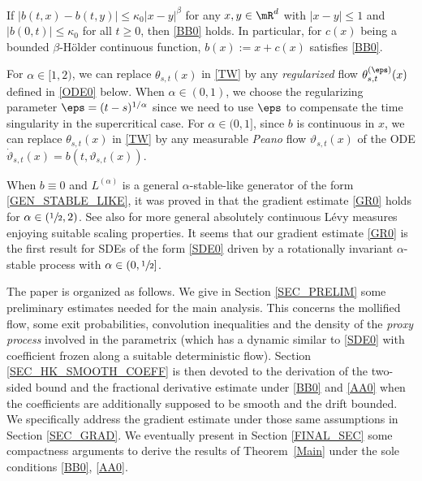 \begin{remark}
If $|b(t,x)-b(t,y)|\leq\kappa_0|x-y|^\beta$ for any $x,y\in\mR^d$ with $|x-y|\leq 1$ and $|b(0,t)|\le \kappa_0 $ for all $t\ge 0 $, then
\eqref{BB0} holds. In particular, for $c(x)$ being a bounded $\beta$-Hölder continuous function, $b(x):=x+c(x)$ satisfies \eqref{BB0}.
\end{remark}

\begin{remark}
For $\alpha\in[1,2)$, we can replace $\theta_{s,t}(x)$ in \eqref{TW} by any {\it regularized} flow $\theta^{(\eps)}_{s,t}(x)$
defined in \eqref{ODE0} below. When $\alpha\in(0,1)$, we choose the regularizing parameter $\eps=(t-s)^{1/\alpha}$ since we need to use $\eps$ to compensate the
time singularity in the supercritical case.
For $\alpha\in(0,1]$, since $b$ is continuous in $x$, we can replace $\theta_{s,t}(x)$ in \eqref{TW} by any measurable {\it Peano} flow $\vartheta_{s,t}(x)$ of the ODE
$\dot\vartheta_{s,t}(x)=b(t,\vartheta_{s,t}(x))$.
\end{remark}

\begin{remark}
When $b\equiv 0$ and $L^{(\alpha)}$ is a general $\alpha$-stable-like {generator of the form \eqref{GEN_STABLE_LIKE}}, it was proved in \cite{Li-So-Xi}
that the gradient estimate \eqref{GR0} holds for $\alpha\in(\sfrac12,2)$. See also \cite{Ch-Zh20} for more general
{absolutely continuous Lévy measures enjoying suitable scaling properties.
}
It seems that our gradient estimate \eqref{GR0} is the first result for SDEs of the form \eqref{SDE0} driven by a rotationally invariant $\alpha$-stable process
with $\alpha\in(0,\sfrac12]$.
\end{remark}

The paper is organized as follows. We give in Section \ref{SEC_PRELIM} some preliminary estimates needed for the main analysis. This concerns the mollified flow, some exit probabilities, convolution inequalities and the density of the \textit{proxy process} involved in the parametrix (which has a dynamic similar to \eqref{SDE0} with coefficient frozen along a suitable deterministic flow).
Section \ref{SEC_HK_SMOOTH_COEFF} is then {devoted} to the derivation of the two-sided bound and the fractional derivative estimate under \eqref{BB0} and \eqref{AA0} when the coefficients are additionally supposed to be smooth and the drift bounded. We specifically address the gradient estimate under those same assumptions in Section \ref{SEC_GRAD}. We eventually present in Section \ref{FINAL_SEC} some compactness arguments to derive the results of Theorem~\ref{Main} under the sole conditions \eqref{BB0}, \eqref{AA0}.

